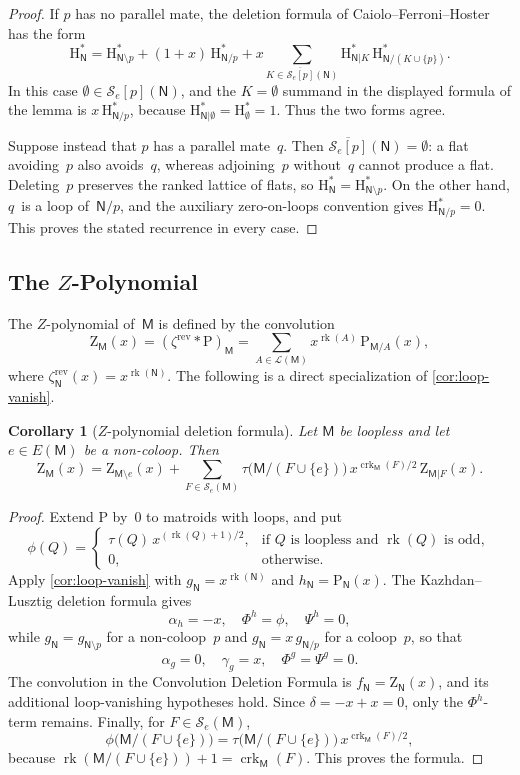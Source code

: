 \documentclass[12pt,letterpaper,english]{amsart}
\theoremstyle{teoremas}
\newtheorem{corollary}[theorem]{Corollary}
\theoremstyle{definition}
\DeclareMathOperator{\rk}{rk}
\DeclareMathOperator{\crk}{crk}
\newcommand{\M}{\mathsf{M}}
\newcommand{\N}{\mathsf{N}}
\newcommand{\Hstar}{\mathrm{H}^{*}}
\newcommand{\PP}{\mathrm{P}}
\newcommand{\ZP}{\mathrm{Z}} %
\newcommand{\rev}{\mathrm{rev}}
\newcommand{\Se}{\mathcal{S}_e}
\begin{document}
\begin{proof}
If $p$ has no parallel mate, the deletion formula of
Caiolo--Ferroni--Hoster has the form
\[
\Hstar_{\N} = \Hstar_{\N \setminus p} + (1+x)\, \Hstar_{\N/p}
  + x \sum_{K \in \overline{\Se[p]}(\N)}
    \Hstar_{\N|K}\, \Hstar_{\N/(K \cup \{p\})}.
\]
In this case $\emptyset \in \Se[p](\N)$, and the $K = \emptyset$ summand
in the displayed formula of the lemma is $x\, \Hstar_{\N/p}$, because
$\Hstar_{\N|\emptyset} = \Hstar_{\emptyset} = 1$.
Thus the two forms agree.

Suppose instead that $p$ has a parallel mate~$q$.
Then $\overline{\Se[p]}(\N) = \emptyset$: a flat avoiding~$p$ also
avoids~$q$, whereas adjoining~$p$ without~$q$ cannot produce a flat.
Deleting~$p$ preserves the ranked lattice of flats, so
$\Hstar_{\N} = \Hstar_{\N \setminus p}$.
On the other hand, $q$~is a loop of~$\N/p$, and the auxiliary
zero-on-loops convention gives $\Hstar_{\N/p} = 0$.
This proves the stated recurrence in every case.
\end{proof}


\subsection{The $Z$-Polynomial}
The $Z$-polynomial of~$\M$ is defined by the convolution
\begin{equation}\label{eq:Z-def}
\ZP_{\M}(x) = (\zeta^{\rev} * \PP)_{\M}
= \sum_{A \in \mathcal{L}(\M)} x^{\rk(A)}\, \PP_{\M/A}(x),
\end{equation}
where $\zeta^{\rev}_{\N}(x) = x^{\rk(\N)}$.
The following is a direct specialization of \cref{cor:loop-vanish}.

\begin{corollary}[$Z$-polynomial deletion formula]\label{cor:Z-del}
Let $\M$ be loopless and let $e \in E(\M)$ be a non-coloop.  Then
\[
\ZP_{\M}(x) = \ZP_{\M \setminus e}(x)
  + \sum_{F \in \Se(\M)}
    \tau\bigl(\M/(F \cup \{e\})\bigr)\, x^{\crk_{\M}(F)/2}\,
    \ZP_{\M|F}(x).
\]
\end{corollary}

\begin{proof}
Extend $\PP$ by~$0$ to matroids with loops, and put
\[
\phi(Q) =
\begin{cases}
\tau(Q)\, x^{(\rk(Q)+1)/2}, & \text{if $Q$ is loopless and $\rk(Q)$ is odd},\\
0, & \text{otherwise}.
\end{cases}
\]
Apply \cref{cor:loop-vanish} with
$g_{\N} = x^{\rk(\N)}$ and $h_{\N} = \PP_{\N}(x)$.
The Kazhdan--Lusztig deletion formula gives
\[
\alpha_h = -x,\quad \Phi^h = \phi,\quad \Psi^h = 0,
\]
while $g_{\N} = g_{\N \setminus p}$ for a non-coloop~$p$ and
$g_{\N} = x\, g_{\N/p}$ for a coloop~$p$, so that
\[
\alpha_g = 0,\quad \gamma_g = x,\quad \Phi^g = \Psi^g = 0.
\]
The convolution in the Convolution Deletion Formula is
$f_{\N} = \ZP_{\N}(x)$, and its additional loop-vanishing hypotheses hold.
Since $\delta = -x + x = 0$, only the $\Phi^h$-term remains.
Finally, for $F \in \Se(\M)$,
\[
\phi\bigl(\M/(F \cup \{e\})\bigr)
= \tau\bigl(\M/(F \cup \{e\})\bigr)\, x^{\crk_{\M}(F)/2},
\]
because $\rk(\M/(F \cup \{e\})) + 1 = \crk_{\M}(F)$.
This proves the formula.
\end{proof}
\end{document}
